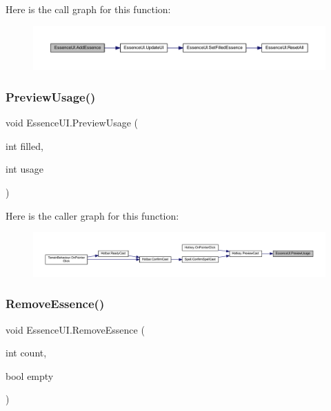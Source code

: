Here is the call graph for this function\+:
\nopagebreak
\begin{figure}[H]
\begin{center}
\leavevmode
\includegraphics[width=350pt]{class_essence_u_i_a1fd3a11e5b47cd87758d337fe1f61384_cgraph}
\end{center}
\end{figure}
\mbox{\label{class_essence_u_i_abe39202e5f4c5134bd6a16ddfd8bb017}} 
\subsubsection{\texorpdfstring{PreviewUsage()}{PreviewUsage()}}
{\footnotesize\ttfamily void Essence\+U\+I.\+Preview\+Usage (\begin{DoxyParamCaption}\item[{int}]{filled,  }\item[{int}]{usage }\end{DoxyParamCaption})}

Here is the caller graph for this function\+:
\nopagebreak
\begin{figure}[H]
\begin{center}
\leavevmode
\includegraphics[width=350pt]{class_essence_u_i_abe39202e5f4c5134bd6a16ddfd8bb017_icgraph}
\end{center}
\end{figure}
\mbox{\label{class_essence_u_i_a39b3c1ec97a29130e2e8ab4050921ed6}} 
\subsubsection{\texorpdfstring{RemoveEssence()}{RemoveEssence()}}
{\footnotesize\ttfamily void Essence\+U\+I.\+Remove\+Essence (\begin{DoxyParamCaption}\item[{int}]{count,  }\item[{bool}]{empty }\end{DoxyParamCaption})}


